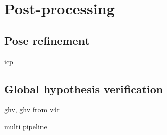 
\chapter{Post-processing}
\label{cha:postproc}


\section{Pose refinement}
\label{sec:icp}

icp


\section{Global hypothesis verification}
\label{sec:ghv}

ghv, ghv from v4r

multi pipeline